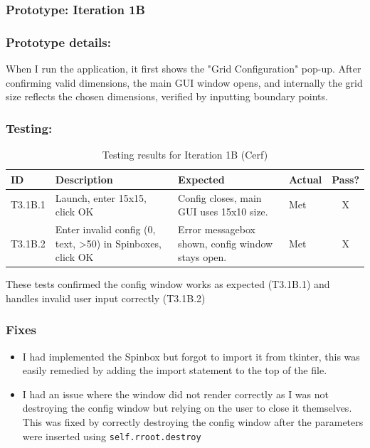 \newpage
\subsubsection*{Prototype: Iteration 1B}



\newpage

\subsubsection{Prototype details:}
When I run the application, it first shows the "Grid Configuration" pop-up. After confirming valid dimensions, the main GUI window opens, and internally the grid size reflects the chosen dimensions, verified by inputting boundary points.

\subsubsection{Testing:}
\begin{table}[htbp]
	\centering
	\begin{tabularx}{\textwidth}{|l|X|p{4.5cm}|p{1.5cm}|c|}
		\hline
		\textbf{ID} & \textbf{Description} & \textbf{Expected} & \textbf{Actual} & \textbf{Pass?} \\
		\hline
		T3.1B.1 & Launch, enter 15x15, click OK & Config closes, main GUI uses 15x10 size. & Met & X \\
		\hline
		T3.1B.2 & Enter invalid config (0, text, >50) in Spinboxes, click OK & Error messagebox shown, config window stays open. & Met & X \\
		\hline
	\end{tabularx}
	\caption{Testing results for Iteration 1B (Cerf)}
\end{table}
These tests confirmed the config window works as expected (T3.1B.1) and handles invalid user input correctly (T3.1B.2)

\subsubsection{Fixes}
\begin{itemize}
	\item I had implemented the Spinbox but forgot to import it from tkinter, this was easily remedied by adding the import statement to the top of the file.
	\item I had an issue where the window did not render correctly as I was not destroying the config window but relying on the user to close it themselves. This was fixed by correctly destroying the config window after the parameters were inserted using \verb|self.rroot.destroy|
\end{itemize}

